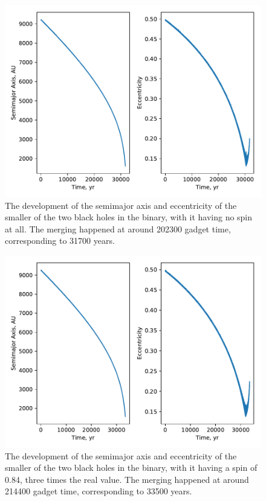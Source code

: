 \documentclass[english, oneside]{HYgradu}
\begin{document}
\begin{figure}[h!tb]
\centering
\includegraphics[width=\textwidth]{../images/spin0.pdf}
\caption{The development of the semimajor axis and eccentricity of the smaller of the two black holes in the binary, with it having no spin at all. The merging happened at around 202300 gadget time, corresponding to 31700 years.}
\label{fig:spin0}
\end{figure}

\begin{figure}[h!tb]
\centering
\includegraphics[width=\textwidth]{../images/spin3.pdf}
\caption{The development of the semimajor axis and eccentricity of the smaller of the two black holes in the binary, with it having a spin of 0.84, three times the real value. The merging happened at around 214400 gadget time, corresponding to 33500 years.}
\label{fig:spin3}
\end{figure}
\end{document}
